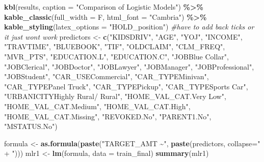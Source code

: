 \documentclass[
]{article}
\newenvironment{Shaded}{\begin{snugshade}}{\end{snugshade}}
\newcommand{\AttributeTok}[1]{\textcolor[rgb]{0.13,0.29,0.53}{#1}}
\newcommand{\CommentTok}[1]{\textcolor[rgb]{0.56,0.35,0.01}{\textit{#1}}}
\newcommand{\FunctionTok}[1]{\textcolor[rgb]{0.13,0.29,0.53}{\textbf{#1}}}
\newcommand{\NormalTok}[1]{#1}
\newcommand{\OtherTok}[1]{\textcolor[rgb]{0.56,0.35,0.01}{#1}}
\newcommand{\SpecialCharTok}[1]{\textcolor[rgb]{0.81,0.36,0.00}{\textbf{#1}}}
\newcommand{\StringTok}[1]{\textcolor[rgb]{0.31,0.60,0.02}{#1}}
\begin{document}
\begin{Shaded}
\begin{Highlighting}[]
\FunctionTok{kbl}\NormalTok{(results, }\AttributeTok{caption =} \StringTok{"Comparison of Logistic Models"}\NormalTok{) }\SpecialCharTok{\%\textgreater{}\%}
  \FunctionTok{kable\_classic}\NormalTok{(}\AttributeTok{full\_width =}\NormalTok{ F, }\AttributeTok{html\_font =} \StringTok{"Cambria"}\NormalTok{) }\SpecialCharTok{\%\textgreater{}\%}
  \FunctionTok{kable\_styling}\NormalTok{(}\AttributeTok{latex\_options =} \StringTok{"HOLD\_position"}\NormalTok{)}
\CommentTok{\#have to add back ticks or it just won\textquotesingle{}t work}
\NormalTok{predictors }\OtherTok{\textless{}{-}} \FunctionTok{c}\NormalTok{(}\StringTok{"KIDSDRIV"}\NormalTok{, }\StringTok{"AGE"}\NormalTok{, }\StringTok{"YOJ"}\NormalTok{, }\StringTok{"INCOME"}\NormalTok{, }\StringTok{"TRAVTIME"}\NormalTok{, }\StringTok{"BLUEBOOK"}\NormalTok{, }\StringTok{"TIF"}\NormalTok{,}
                \StringTok{"OLDCLAIM"}\NormalTok{, }\StringTok{"CLM\_FREQ"}\NormalTok{, }\StringTok{"MVR\_PTS"}\NormalTok{, }\StringTok{"EDUCATION.L"}\NormalTok{, }\StringTok{"EDUCATION.C"}\NormalTok{,}
                \StringTok{"\textasciigrave{}JOBBlue Collar\textasciigrave{}"}\NormalTok{, }\StringTok{"JOBClerical"}\NormalTok{, }\StringTok{"JOBDoctor"}\NormalTok{, }\StringTok{"JOBLawyer"}\NormalTok{,}
                \StringTok{"JOBManager"}\NormalTok{, }\StringTok{"JOBProfessional"}\NormalTok{, }\StringTok{"JOBStudent"}\NormalTok{, }\StringTok{"CAR\_USECommercial"}\NormalTok{,}
                \StringTok{"CAR\_TYPEMinivan"}\NormalTok{, }\StringTok{"\textasciigrave{}CAR\_TYPEPanel Truck\textasciigrave{}"}\NormalTok{, }\StringTok{"CAR\_TYPEPickup"}\NormalTok{,}
                \StringTok{"\textasciigrave{}CAR\_TYPESports Car\textasciigrave{}"}\NormalTok{, }\StringTok{"\textasciigrave{}URBANICITYHighly Rural/ Rural\textasciigrave{}"}\NormalTok{,}
                \StringTok{"\textasciigrave{}HOME\_VAL\_CAT.Very Low\textasciigrave{}"}\NormalTok{, }\StringTok{"HOME\_VAL\_CAT.Medium"}\NormalTok{, }\StringTok{"HOME\_VAL\_CAT.High"}\NormalTok{,}
                \StringTok{"HOME\_VAL\_CAT.Missing"}\NormalTok{, }\StringTok{"REVOKED.No"}\NormalTok{, }\StringTok{"PARENT1.No"}\NormalTok{, }\StringTok{"MSTATUS.No"}\NormalTok{)}

\NormalTok{formula }\OtherTok{\textless{}{-}} \FunctionTok{as.formula}\NormalTok{(}\FunctionTok{paste}\NormalTok{(}\StringTok{"TARGET\_AMT \textasciitilde{}"}\NormalTok{, }\FunctionTok{paste}\NormalTok{(predictors, }\AttributeTok{collapse=}\StringTok{" + "}\NormalTok{)))}
\NormalTok{mlr1 }\OtherTok{\textless{}{-}} \FunctionTok{lm}\NormalTok{(formula, }\AttributeTok{data =}\NormalTok{ train\_final)}
\FunctionTok{summary}\NormalTok{(mlr1)}



\end{Highlighting}
\end{Shaded}
\end{document}
